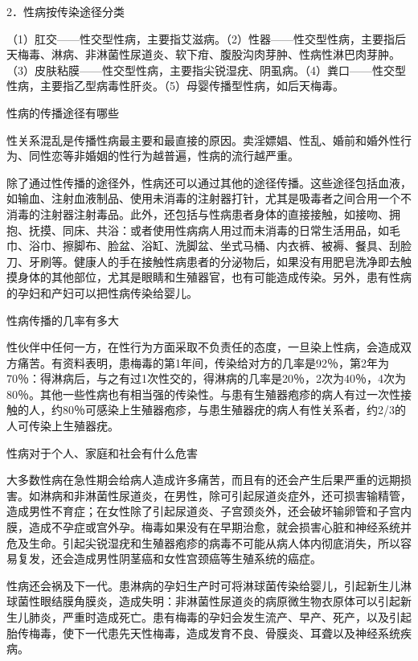 \documentclass[12pt,UTF8]{ctexbook}
\begin{document}
2．性病按传染途径分类

（1）肛交——性交型性病，主要指艾滋病。（2）性器——性交型性病，主要指后天梅毒、淋病、非淋菌性尿道炎、软下疳、腹股沟肉芽肿、性病性淋巴肉芽肿。（3）皮肤粘膜——性交型性病，主要指尖锐湿疣、阴虱病。（4）粪口——性交型性病，主要指乙型病毒性肝炎。（5）母婴传播型性病，如后天梅毒。





性病的传播途径有哪些


性关系混乱是传播性病最主要和最直接的原因。卖淫嫖娼、性乱、婚前和婚外性行为、同性恋等非婚姻的性行为越普遍，性病的流行越严重。

除了通过性传播的途径外，性病还可以通过其他的途径传播。这些途径包括血液，如输血、注射血液制品、使用未消毒的注射器打针，尤其是吸毒者之间合用一个不消毒的注射器注射毒品。此外，还包括与性病患者身体的直接接触，如接吻、拥抱、抚摸、同床、共浴：或者使用性病病人用过而未消毒的日常生活用品，如毛巾、浴巾、擦脚布、脸盆、浴缸、洗脚盆、坐式马桶、内衣裤、被褥、餐具、刮脸刀、牙刷等。健康人的手在接触性病患者的分泌物后，如果没有用肥皂洗净即去触摸身体的其他部位，尤其是眼睛和生殖器官，也有可能造成传染。另外，患有性病的孕妇和产妇可以把性病传染给婴儿。





性病传播的几率有多大


性伙伴中任何一方，在性行为方面采取不负责任的态度，一旦染上性病，会造成双方痛苦。有资料表明，患梅毒的第1年间，传染给对方的几率是92％，第2年为70％：得淋病后，与之有过1次性交的，得淋病的几率是20％，2次为40％，4次为80％。其他一些性病也有相当强的传染性。与患有生殖器疱疹的病人有过一次性接触的人，约80％可感染上生殖器疱疹，与患生殖器疣的病人有性关系者，约2/3的人可传染上生殖器疣。





性病对于个人、家庭和社会有什么危害


大多数性病在急性期会给病人造成许多痛苦，而且有的还会产生后果严重的远期损害。如淋病和非淋菌性尿道炎，在男性，除可引起尿道炎症外，还可损害输精管，造成男性不育症；在女性除了引起尿道炎、子宫颈炎外，还会破坏输卵管和子宫内膜，造成不孕症或宫外孕。梅毒如果没有在早期治愈，就会损害心脏和神经系统并危及生命。引起尖锐湿疣和生殖器疱疹的病毒不可能从病人体内彻底消失，所以容易复发，还会造成男性阴茎癌和女性宫颈癌等生殖系统的癌症。

性病还会祸及下一代。患淋病的孕妇生产时可将淋球菌传染给婴儿，引起新生儿淋球菌性眼结膜角膜炎，造成失明：非淋菌性尿道炎的病原微生物衣原体可以引起新生儿肺炎，严重时造成死亡。患有梅毒的孕妇会发生流产、早产、死产，以及引起胎传梅毒，使下一代患先天性梅毒，造成发育不良、骨膜炎、耳聋以及神经系统疾病。
\end{document}
